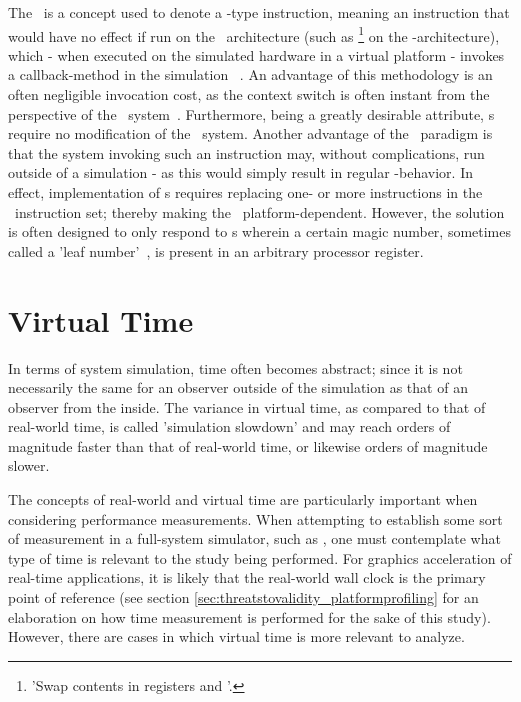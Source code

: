 The \dvttermmagicinstruction\ is a concept used to denote a -type instruction, meaning an instruction that would have no effect if run on the \dvttermtarget\ architecture (such as \footnote{'Swap contents in registers  and '.} on the \dvttermxeightysix -architecture), which - when executed on the simulated hardware in a virtual platform - invokes a callback-method in the simulation \dvttermhost ~.
An advantage of this methodology is an often negligible invocation cost, as the context switch is often instant from the perspective of the \dvttermtarget\ system~.
Furthermore, being a greatly desirable attribute, \dvttermmagicinstruction s require no modification of the \dvttermtarget\ system.
Another advantage of the \dvttermmagicinstruction\ paradigm is that the system invoking such an instruction may, without complications, run outside of a simulation - as this would simply result in regular -behavior.
In effect, implementation of \dvttermmagicinstruction s requires replacing one- or more instructions in the \dvttermtarget\ instruction set; thereby making the \dvttermmagicinstruction\ platform-dependent.
However, the solution is often designed to only respond to \dvttermmagicinstruction s wherein a certain magic number, sometimes called a 'leaf number'~, is present in an arbitrary processor register.

\section{Virtual Time}
\label{sec:backgroundandrelatedwork_virtualtime}
In terms of system simulation, time often becomes abstract; since it is not necessarily the same for an observer outside of the simulation as that of an observer from the inside.
The variance in virtual time, as compared to that of real-world time, is called 'simulation slowdown' and may reach orders of magnitude faster than that of real-world time, or likewise orders of magnitude slower.

The concepts of real-world and virtual time are particularly important when considering performance measurements.
When attempting to establish some sort of measurement in a full-system simulator, such as \dvttermsimics , one must contemplate what type of time is relevant to the study being performed.
For graphics acceleration of real-time applications, it is likely that the real-world wall clock is the primary point of reference (see section \ref{sec:threatstovalidity_platformprofiling} for an elaboration on how time measurement is performed for the sake of this study).
However, there are cases in which virtual time is more relevant to analyze.
